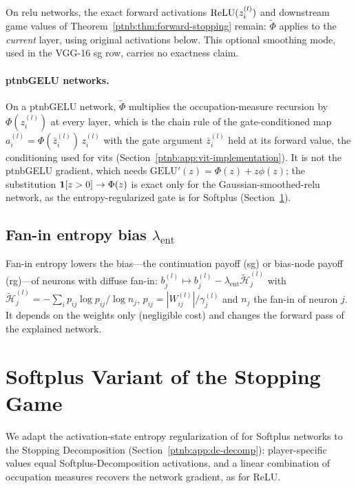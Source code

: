 On \ac{relu} networks, the exact forward activations $\text{ReLU}(z_i^{(l)})$ and downstream game
values of Theorem~\ref{ptnb:thm:forward-stopping} remain: $\tilde\Phi$ applies to the \emph{current}
layer, using original activations below. This optional smoothing mode, used in the VGG-16 \ac{sg}
row, carries no exactness claim.

\paragraph{\acs{ptnbGELU} networks.}\label{ptnb:app:gelu-noisy-gate}
On a \acs{ptnbGELU} network, $\tilde\Phi$ multiplies the occupation-measure recursion by
$\Phi(z_i^{(l)})$ at every layer, which is the chain rule of the gate-conditioned map $a_i^{(l)} =
    \Phi(\bar z_i^{(l)})\, z_i^{(l)}$ with the gate argument $\bar z_i^{(l)}$ held at its forward
value, the conditioning used for \acs{vit}s (Section~\ref{ptnb:app:vit-implementation}). It is not the
\acs{ptnbGELU} gradient, which needs $\mathrm{GELU}'(z) = \Phi(z) + z\phi(z)$; the substitution
$\mathbf{1}[z>0] \to \Phi(z)$ is exact only for the Gaussian-smoothed-\acs{relu} network, as the
entropy-regularized gate is for Softplus (Section~\ref{ptnb:app:softplus-stopping-game}).

\subsection{\texorpdfstring{Fan-in entropy bias $\lambda_{\mathrm{ent}}$}{Fan-in entropy bias lambda\_ent}}\label{ptnb:app:entropy-mode}

Fan-in entropy lowers the bias---the continuation payoff (\ac{sg}) or bias-node
payoff (\ac{rg})---of neurons with diffuse fan-in: $b_j^{(l)} \mapsto b_j^{(l)} -
    \lambda_{\mathrm{ent}}\tilde{\mathcal{H}}_j^{(l)}$ with $\tilde{\mathcal{H}}_j^{(l)} = -\sum_i
    p_{ij}\log p_{ij}/\log n_j$, $p_{ij} = |W_{ij}^{(l)}|/\gamma_j^{(l)}$ and $n_j$ the fan-in of
neuron $j$. It depends on the weights only (negligible cost) and changes the forward pass of the
explained network.
\par\medskip
\section{Softplus Variant of the Stopping Game}\label{ptnb:app:softplus-stopping-game}

We adapt the activation-state entropy regularization of \textcite{Gaubert2025} for Softplus networks
to the Stopping Decomposition (Section~\ref{ptnb:app:dc-decomp}): player-specific values equal
Softplus-Decomposition activations, and a linear combination of occupation measures recovers the
network gradient, as for ReLU.

